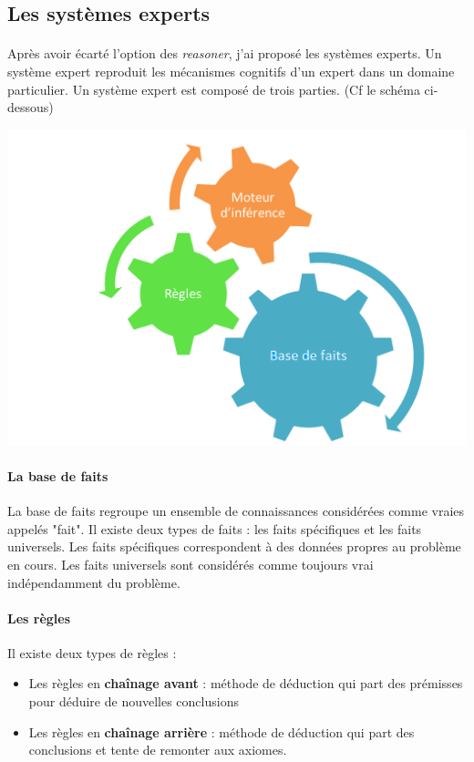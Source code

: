 \documentclass {report}
\begin{document}
    

\subsection{Les systèmes experts}
\paragraph{}
Après avoir écarté l'option des \textit{reasoner}, j'ai proposé les systèmes experts. Un système expert reproduit les mécanismes cognitifs d'un expert dans un domaine particulier. Un système expert est composé de trois parties. (Cf le schéma ci-dessous)
\begin{multicols}{2}
\begin{center}
\includegraphics[scale=0.3]{se.png}
\end{center}

\paragraph{La base de faits}
La base de faits regroupe un ensemble de connaissances considérées comme vraies appelés "fait". Il existe deux types de faits : les faits spécifiques et les faits universels. Les faits spécifiques correspondent à des données propres au problème en cours. Les faits universels sont considérés comme toujours vrai indépendamment du problème.


\paragraph{Les règles}
Il existe deux types de règles : 
\begin{itemize}
    \item Les règles en \textbf{chaînage avant} : méthode de déduction qui part des prémisses pour déduire de nouvelles conclusions
    \item Les règles en \textbf{chaînage arrière} : méthode de déduction qui part des conclusions et tente de remonter aux axiomes.
\end{itemize}
\end{multicols}
\end{document}

